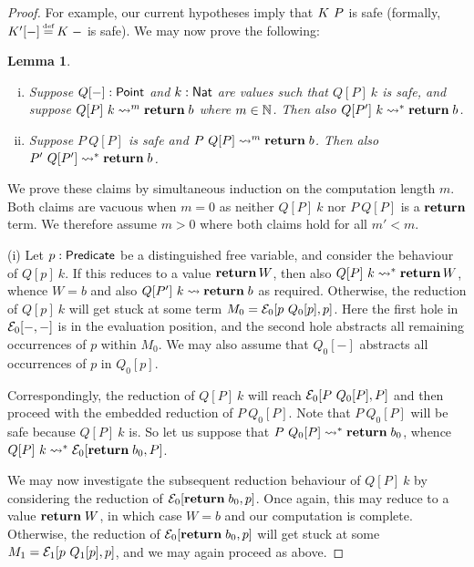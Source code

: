 \documentclass[12pt,phd,lfcs,twoside,openright,logo,leftchapter,normalheadings]{infthesis}
\theoremstyle{plain}
\newtheorem{lemma}[theorem]{Lemma}
\theoremstyle{definition}
\begin{document}
\begin{proof}
  For example, our current hypotheses imply that $K~P$ is safe
  (formally, $\Countprog'[-] \defas \Countprog\;-$ is safe).
  We may now prove the following:

  \begin{lemma}\label{lem:replacement}
    ~
    \begin{enumerate}[(i)]
      \item Suppose $Q[-] : \mathsf{Point}$ and $k : \mathsf{Nat}$ are values such that
    $Q[P]~k$ is safe, and suppose $Q[P]~k \leadsto^m \mathbf{return}\;b$
    where $m \in \mathbb{N}$.  Then also $Q[P']~k \leadsto^\ast \mathbf{return}\;b$.

    \item Suppose $P~Q[P]$ is safe and $P~Q[P] \leadsto^m
    \mathbf{return}\;b$. Then also
    $P'~Q[P'] \leadsto^\ast \mathbf{return}\;b$.
    \end{enumerate}
  \end{lemma}

  We prove these claims by simultaneous induction on the computation
  length $m$.  Both claims are vacuous when $m=0$ as neither $Q[P]~k$
  nor $P~Q[P]$ is a $\mathbf{return}$ term.  We therefore assume $m>0$ where
  both claims hold for all $m'<m$.

  (i) Let $p:\mathsf{Predicate}$ be a distinguished free variable, and
  consider the behaviour of $Q[p]~k$. If this reduces to a value
  $\mathbf{return}\,W$, then also $Q[P]~k \leadsto^\ast\mathbf{return}\,W$, whence
  $W = b$ and also $Q[P']~k \leadsto \mathbf{return}\;b$ as required.
  Otherwise, the reduction of $Q[p]~k$ will get stuck at some term
  $M_0 = \mathcal{E}_0[p~Q_0[p], p]$.
  Here the first hole in $\mathcal{E}_0[-,-]$ is in the evaluation position,
  and the second hole abstracts all remaining occurrences of $p$
  within $M_0$. We may also assume that $Q_0[-]$ abstracts all
  occurrences of $p$ in $Q_0[p]$.

  Correspondingly, the reduction of $Q[P]~k$ will reach
  $\mathcal{E}_0[P~Q_0[P], P]$ and then proceed with the embedded reduction of
  $P~Q_0[P]$.  Note that $P~Q_0[P]$ will be safe because $Q[P]~k$ is.
  So let us suppose that $P~Q_0[P] \leadsto^\ast \mathbf{return}\;b_0$,
  whence $Q[P]~k \leadsto^\ast \mathcal{E}_0[\mathbf{return}\;b_0, P]$.

  We may now investigate the subsequent reduction behaviour of
  $Q[P]~k$ by considering the reduction of $\mathcal{E}_0[\mathbf{return}\;b_0, p]$.
  Once again, this may reduce to a value $\mathbf{return}\;W$, in which case
  $W = b$ and our computation is complete.  Otherwise, the reduction
  of $\mathcal{E}_0[\mathbf{return}\;b_0, p]$ will get stuck at some $M_1 =
  \mathcal{E}_1[p~Q_1[p], p]$, and we may again proceed as above.


\end{proof}
\end{document}
